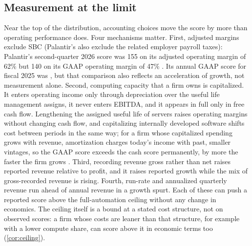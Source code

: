 \subsection{Measurement at the limit}
Near the top of the distribution, accounting choices move the score by more than operating performance does. Four mechanisms matter. First, adjusted margins exclude SBC (Palantir's also exclude the related employer payroll taxes): Palantir's second-quarter 2026 score was 155 on its adjusted operating margin of 62\% but 140 on its GAAP operating margin of 47\% \citep{palantir2026q2}. Its annual GAAP score for fiscal 2025 was \PalantirGAAP, but that comparison also reflects an acceleration of growth, not measurement alone. Second, computing capacity that a firm owns is capitalized. It enters operating income only through depreciation over the useful life management assigns, it never enters EBITDA, and it appears in full only in free cash flow. Lengthening the assigned useful life of servers raises operating margins without changing cash flow, and capitalizing internally developed software shifts cost between periods in the same way; for a firm whose capitalized spending grows with revenue, amortization charges today's income with past, smaller vintages, so the GAAP score exceeds the cash score permanently, by more the faster the firm grows \citep{murthy2026transformation}. Third, recording revenue gross rather than net raises reported revenue relative to profit, and it raises reported growth while the mix of gross-recorded revenue is rising. Fourth, run-rate and annualized quarterly revenue run ahead of annual revenue in a growth spurt. Each of these can push a reported score above the full-automation ceiling without any change in economics. The ceiling itself is a bound at a stated cost structure, not on observed scores: a firm whose costs are leaner than that structure, for example with a lower compute share, can score above it in economic terms too (\autoref{cor:ceiling}).

